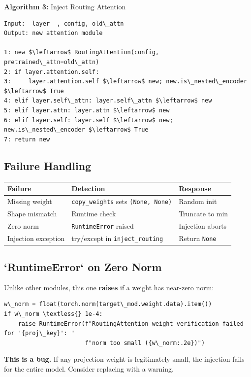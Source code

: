 \textbf{Algorithm 3:} Inject Routing Attention
\begin{lstlisting}
Input:  layer  , config, old\_attn
Output: new attention module

1: new $\leftarrow$ RoutingAttention(config, pretrained\_attn=old\_attn)
2: if layer.attention.self: 
3:     layer.attention.self $\leftarrow$ new; new.is\_nested\_encoder $\leftarrow$ True
4: elif layer.self\_attn: layer.self\_attn $\leftarrow$ new
5: elif layer.attn: layer.attn $\leftarrow$ new
6: elif layer.self: layer.self $\leftarrow$ new; new.is\_nested\_encoder $\leftarrow$ True
7: return new
\end{lstlisting}

\subsection{Failure Handling}

\begin{table}[H]
\centering
\small
\begin{tabular}{lll}
\toprule
\textbf{Failure} & \textbf{Detection} & \textbf{Response} \\
\midrule
Missing weight & \texttt{copy\_weights} sets \texttt{(None, None)} & Random init \\
Shape mismatch & Runtime check & Truncate to min \\
Zero norm & \texttt{RuntimeError} raised & Injection aborts \\
Injection exception & try/except in \texttt{inject\_routing} & Return \texttt{None} \\
\bottomrule
\end{tabular}
\end{table}

\subsection{`RuntimeError` on Zero Norm}

Unlike other modules, this one \textbf{raises} if a weight has near-zero norm:

\begin{lstlisting}
w\_norm = float(torch.norm(target\_mod.weight.data).item())
if w\_norm \textless{} 1e-4:
    raise RuntimeError(f"RoutingAttention weight verification failed for '{proj\_key}': "
                       f"norm too small ({w\_norm:.2e})")
\end{lstlisting}

\textbf{This is a bug.} If any projection weight is legitimately small, the 
injection fails for the entire model. Consider replacing with a warning.

